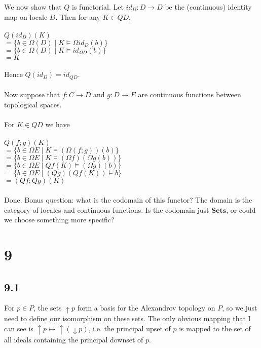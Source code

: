 \documentclass{article}
\newcommand{\mbf}{\mathbf}
\begin{document}
We now show that $Q$ is functorial. 
Let $\mathit{id}_D : D \to D$ be the (continuous) identity map on locale $D$. 
Then for any $K \in QD$,\\~\\
$Q(\mathit{id}_D)(K)$\\
$= \{ b \in \Omega(D) \mid K \vDash \Omega \mathit{id_D} (b) \}$\\ 
$= \{ b \in \Omega(D) \mid K \vDash id_{\Omega D}(b)\}$\\
$= K$\\~\\
Hence $Q(\mathit{id}_D) = \mathit{id}_{QD}$.\\~\\
Now suppose that $f : C \to D$ and $g : D \to E$ are continuous functions between topological spaces.\\~\\
For $K \in QD$ we have\\~\\
$Q(f;g)(K)$\\
$= \{ b \in \Omega E \mid K \vDash (\Omega (f;g)) (b) \}$\\
$= \{ b \in \Omega E \mid K \vDash (\Omega f)(\Omega g (b)) \}$\\
$= \{ b \in \Omega E \mid Qf(K) \vDash (\Omega g) (b) \}$\\
$= \{ b \in \Omega E \mid (Qg)(Qf(K)) \vDash b \}$\\
$= (Qf;Qg)(K)$\\~\\
Done. Bonus question: what is the codomain of this functor? The domain is the category of locales and continuous functions. Is the codomain just $\mbf{Sets}$, or could we choose something more specific?



\section*{9}

\subsection*{9.1}

For $p \in P$, the sets $\uparrow p$ form a basis for the Alexandrov topology on $P$, so we just need to define our isomorphism on these sets.
The only obvious mapping that I can see is $\uparrow p \mapsto \uparrow (\downarrow p)$, i.e. the principal upset of $p$ is mapped to the set of all ideals containing the principal downset of $p$.
\end{document}
